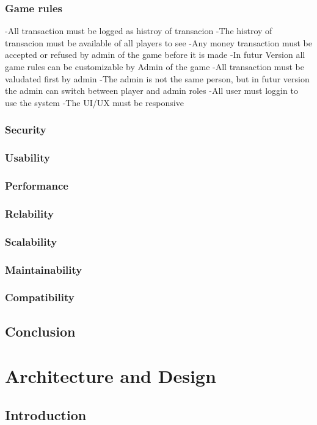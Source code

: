 \documentclass{article}
\begin{document}
\subsubsection{Game rules}
-All transaction must be logged as histroy of transacion
-The histroy of transacion must be available of all players to see
-Any money transaction must be accepted or refused by admin of the game before it is made
-In futur Version all game rules can be customizable by Admin of the game
-All transaction must be valudated first by admin
-The admin is not the same person, but in futur version the admin can switch between player and admin roles
-All user must loggin to use the system
-The UI/UX must be responsive
\subsubsection{Security}
\subsubsection{Usability}
\subsubsection{Performance}
\subsubsection{Relability}
\subsubsection{Scalability}
\subsubsection{Maintainability}
\subsubsection{Compatibility}

\subsection{Conclusion}

\section{Architecture and Design}

\subsection{Introduction}
\end{document}
